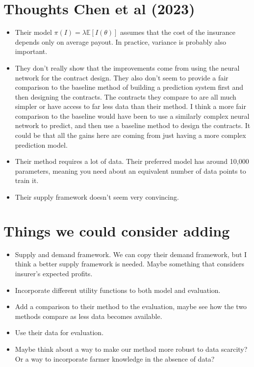 \documentclass[11pt]{article}
\begin{document}
\section{Thoughts Chen et al (2023)}
  \begin{itemize}
    \item Their model $\pi(I) = \lambda \mathbb{E}[I(\theta)]$ assumes that the cost of the insurance depends only on average payout. In practice, variance is probably also important. 
    \item They don't really show that the improvements come from using the neural network for the contract design. They also don't seem to provide a fair comparison to the baseline method of building a prediction system first and then designing the contracts. The contracts they compare to are all much simpler or have access to far less data than their method. I think a more fair comparison to the baseline would have been to use a similarly complex neural network to predict, and then use a baseline method to design the contracts. It could be that all the gains here are coming from just having a more complex prediction model.
    \item Their method requires a lot of data. Their preferred model has around 10,000 parameters, meaning you need about an equivalent number of data points to train it.
    \item Their supply framework doesn't seem very convincing. 
  \end{itemize}

\section{Things we could consider adding}
  \begin{itemize}
    \item Supply and demand framework. We can copy their demand framework, but I think a better supply framework is needed. Maybe something that considers insurer's expected profits. 
    \item Incorporate different utility functions to both model and evaluation.
    \item Add a comparison to their method to the evaluation, maybe see how the two methods compare as less data becomes available. 
    \item Use their data for evaluation. 
    \item Maybe think about a way to make our method more robust to data scarcity? Or a way to incorporate farmer knowledge in the absence of data?
  \end{itemize}
\end{document}
